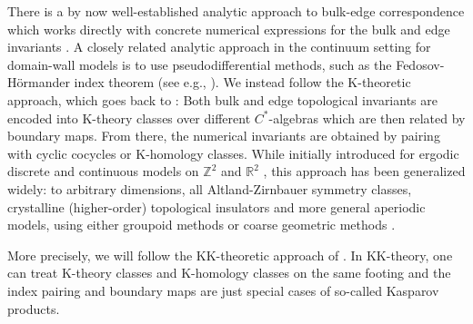 \documentclass[12pt]{amsart}
\newcommand{\RM}{{\mathbb R}}
\newcommand{\ZM}{{\mathbb Z}}
\begin{document}
There is a by now well-established analytic approach to bulk-edge correspondence which works directly with concrete numerical expressions for the bulk and edge invariants \cite{ElbauGraf, GrafPorta, ElgartGrafSchenker2005,GrafShapiro, drouot2024bulk}. A closely related analytic approach in the continuum setting for domain-wall models is to use pseudodifferential methods, such as the Fedosov-Hörmander index theorem (see e.g., \cite{DrouotMicrolocal2021, Bal2022TopologicalInvariants,BalContinuous2019}). We instead follow the K-theoretic approach, which goes back to \cite{KRS04}: Both bulk and edge topological invariants are encoded into K-theory classes over different $C^*$-algebras which are then related by boundary maps. 
From there, the numerical invariants are obtained by pairing with cyclic cocycles or K-homology classes. While initially introduced for ergodic discrete and continuous models on $\ZM^2$ \cite{KRS04} and $\RM^2$ \cite{KellendonkSchulzBaldes2004}, this approach has been generalized widely: to arbitrary dimensions, all Altland-Zirnbauer symmetry classes, crystalline (higher-order) topological insulators and more general aperiodic models, using either groupoid methods or coarse geometric methods \cite{ProdanSchulzBaldes2016,Kubota17,bourne2017k,BourneProdan2018,EwertMeyer,AlldridgeMaxZirnbauer2020, PoloOjitoProdanStoiber2025}.

More precisely, we will follow the KK-theoretic approach of \cite{BourneCareyRennie2015, bourne2017k}. In KK-theory, one can treat K-theory classes and K-homology classes on the same footing and the index pairing and boundary maps are just special cases of so-called Kasparov products.
\end{document}
